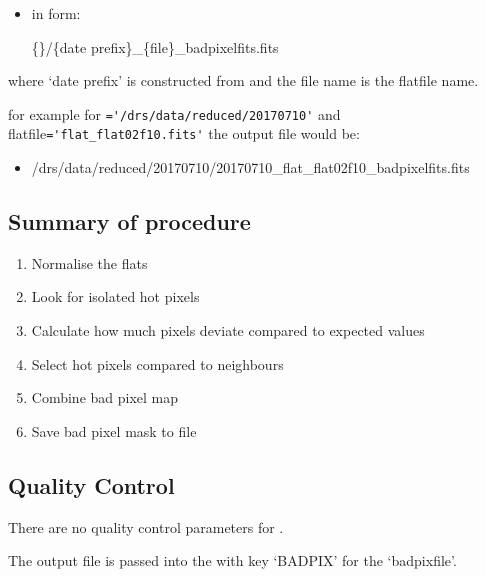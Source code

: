 \begin{itemize}
\item {} in form:
\begin{tcustomdir}
\{\reduceddir\}/\{date prefix\}\_\{file\}\_badpixelfits.fits
\end{tcustomdir}
\end{itemize}

\noindent where `date prefix' is constructed from \argnightname and the file name is the flatfile name.

\noindent for example for \reduceddir\lstinline[style=pythoninline]|='/drs/data/reduced/20170710'| and flatfile\lstinline[style=pythoninline]|='flat_flat02f10.fits'| the output file would be:
\begin{tcustomdir}
\begin{itemize}
\item /drs/data/reduced/20170710/20170710\_flat\_flat02f10\_badpixelfits.fits
\end{itemize}
\end{tcustomdir}

\subsection{Summary of procedure}
\begin{enumerate}
	\item Normalise the flats
	\item Look for isolated hot pixels
	\item Calculate how much pixels deviate compared to expected values
	\item Select hot pixels compared to neighbours
	\item Combine bad pixel map
	\item Save bad pixel mask to file
\end{enumerate}


\subsection{Quality Control}

There are no quality control parameters for \calbadpix.

The output file is passed into the \calibdb with key `BADPIX' for the `badpixfile'. \\

